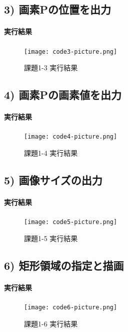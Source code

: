 \documentclass[a4paper,11pt,titlepage]{jsarticle}
\begin{document}
\subsection{3) 画素Pの位置を出力}

\paragraph{実行結果}
\begin{figure}[H]
  \centering
  \texttt{[image: code3-picture.png]}
  \caption{課題1-3 実行結果}
\end{figure}

\subsection{4) 画素Pの画素値を出力}

\paragraph{実行結果}
\begin{figure}[H]
  \centering
  \texttt{[image: code4-picture.png]}
  \caption{課題1-4 実行結果}
\end{figure}

\subsection{5) 画像サイズの出力}

\paragraph{実行結果}
\begin{figure}[H]
  \centering
  \texttt{[image: code5-picture.png]}
  \caption{課題1-5 実行結果}
\end{figure}

\subsection{6) 矩形領域の指定と描画}

\paragraph{実行結果}
\begin{figure}[H]
  \centering
  \texttt{[image: code6-picture.png]}
  \caption{課題1-6 実行結果}
\end{figure}
\end{document}
